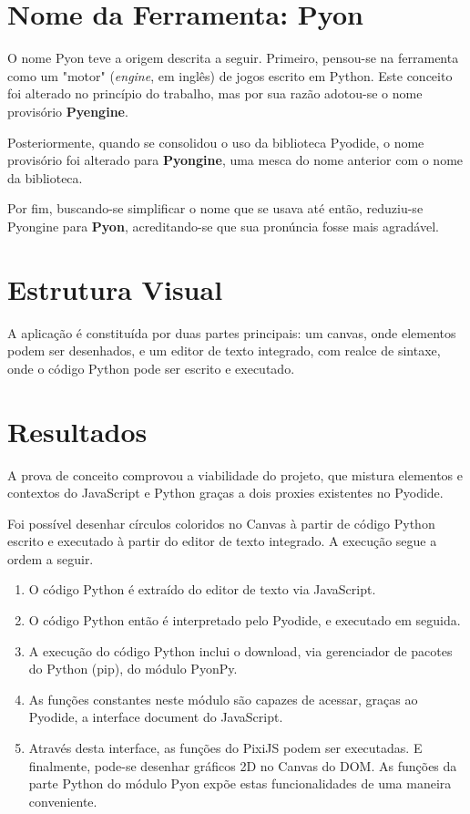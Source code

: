 \begin{apendicesenv}
\section{Nome da Ferramenta: Pyon}

O nome Pyon teve a origem descrita a seguir. Primeiro, pensou-se na ferramenta como um "motor" 
(\textit{engine}, em inglês) de jogos escrito em Python. Este conceito foi alterado no princípio do trabalho, mas por sua razão adotou-se o nome provisório \textbf{Pyengine}.

Posteriormente, quando se consolidou o uso da biblioteca Pyodide, o nome provisório foi alterado para
\textbf{Pyongine}, uma mesca do nome anterior com o nome da biblioteca.

Por fim, buscando-se simplificar o nome que se usava até então, reduziu-se Pyongine para \textbf{Pyon},
acreditando-se que sua pronúncia fosse mais agradável.

\section{Estrutura Visual}

A aplicação é constituída por duas partes principais: um canvas, onde elementos podem ser desenhados, e um editor de texto integrado, com realce de sintaxe, onde o código Python pode ser escrito e executado.

\section{Resultados}

A prova de conceito comprovou a viabilidade do projeto, que mistura elementos e contextos do JavaScript e Python graças a dois proxies existentes no Pyodide.

Foi possível desenhar círculos coloridos no Canvas à partir de código Python escrito e executado à partir do editor de texto integrado. A execução segue a ordem a seguir.

\begin{enumerate}
    \item O código Python é extraído do editor de texto via JavaScript.
    \item O código Python então é interpretado pelo Pyodide, e executado em seguida.
    \item A execução do código Python inclui o download, via gerenciador de pacotes do Python (pip), do módulo PyonPy.
    \item As funções constantes neste módulo são capazes de acessar, graças ao Pyodide, a interface
    document do JavaScript. 
    \item Através desta interface, as funções do PixiJS podem ser executadas. E finalmente, pode-se desenhar gráficos 2D no Canvas do DOM. As funções da parte Python do módulo Pyon expõe estas funcionalidades de uma maneira conveniente.
\end{enumerate}


\end{apendicesenv}

